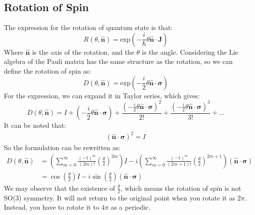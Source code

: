 \documentclass[../main.tex]{subfiles}
\begin{document}
\subsection{Rotation of Spin}
The expression for the rotation of quantum state is that:
\begin{equation}
    R(\theta, \hat{\bm{n}}) = \text{exp}\left(-\frac{i}{\hbar}\theta\hat{\bm{n}}\cdot\hat{\bm{J}}\right)
\end{equation}
Where $\hat{\bm{n}}$ is the axis of the rotation, and the $\theta$ is the angle. Considering the Lie algebra of the Pauli matrix has the same structure as the rotation, so we can define the rotation of spin
as:
\begin{equation}
    D(\theta, \hat{\bm{n}}) = \text{exp}\left(-\frac{i}{2}\theta\hat{\bm{n}}\cdot\bm{\sigma}\right)
\end{equation}
For the expression, we can expand it in Taylor series, which gives:
\begin{equation}
    D(\theta, \hat{\bm{n}}) = I + \left(-\frac{i}{2}\theta\hat{\bm{n}}\cdot\bm{\sigma}\right) + \frac{\left(-\frac{i}{2}\theta\hat{\bm{n}}\cdot\bm{\sigma}\right)^2}{2!}
    + \frac{\left(-\frac{i}{2}\theta\hat{\bm{n}}\cdot\bm{\sigma}\right)^3}{3!}
    + \dots
\end{equation}
It can be noted that:
\begin{align}
    (\hat{\bm{n}}\cdot\bm{\sigma})^2 = I
\end{align}
So the formulation can be rewritten as:
\begin{align}
   D(\theta, \hat{\bm{n}}) &= \left( \sum_{m=0}^{\infty} \frac{(-1)^m}{(2m)!} \left(\frac{\theta}{2}\right)^{2m} \right) I - i \left( \sum_{m=0}^{\infty} \frac{(-1)^m}{(2m+1)!} \left(\frac{\theta}{2}\right)^{2m+1} \right) (\hat{\bm{n}} \cdot \bm{\sigma})\nonumber\\
   &= \cos(\frac{\theta}{2})I - i\sin(\frac{\theta}{2})(\hat{\bm{n}}\cdot\bm{\sigma})
\end{align} 
We may observe that the existence of $\frac{\theta}{2}$, which means the rotation of spin is not SO(3) symmetry. It will not return to the original
point when you rotate it as $2\pi$. Instead, you have to rotate it to $4\pi$ as a periodic.
\end{document}

